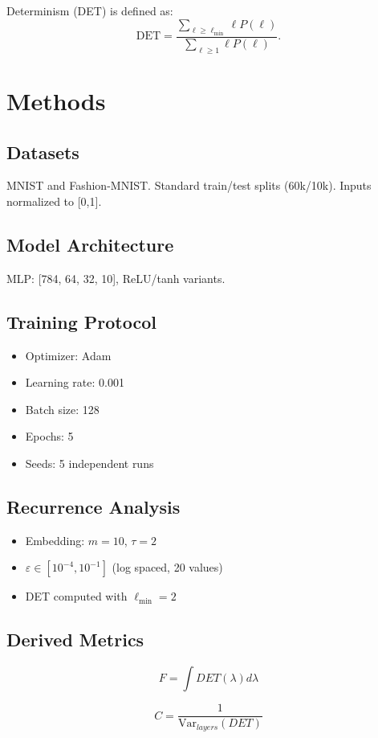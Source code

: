\documentclass[11pt]{article}
\begin{document}
Determinism (DET) is defined as:
\[
	\mathrm{DET} = \frac{\sum_{\ell \geq \ell_{\min}} \ell P(\ell)}{\sum_{\ell \geq 1} \ell P(\ell)}.
\]

\section{Methods}

\subsection{Datasets}
MNIST and Fashion-MNIST. Standard train/test splits (60k/10k). Inputs normalized to [0,1].

\subsection{Model Architecture}
MLP: [784, 64, 32, 10], ReLU/tanh variants.

\subsection{Training Protocol}
\begin{itemize}
	\item Optimizer: Adam
	\item Learning rate: 0.001
	\item Batch size: 128
	\item Epochs: 5
	\item Seeds: 5 independent runs
\end{itemize}

\subsection{Recurrence Analysis}
\begin{itemize}
	\item Embedding: $m=10$, $\tau=2$
	\item $\varepsilon \in [10^{-4}, 10^{-1}]$ (log spaced, 20 values)
	\item DET computed with $\ell_{\min}=2$
\end{itemize}

\subsection{Derived Metrics}

\[
	F = \int DET(\lambda) d\lambda
\]

\[
	C = \frac{1}{\mathrm{Var}_{layers}(DET)}
\]
\end{document}

